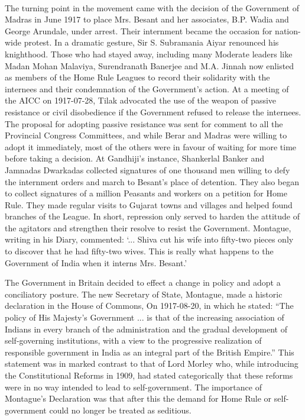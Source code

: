 \begin{multicols}{2}
\paragraph*{}
The turning point in the movement came with the decision of the Government of Madras in June 1917 to place Mrs. Besant and her associates, B.P. Wadia and George Arundale, under arrest. Their internment became the occasion for nation-wide protest. In a dramatic gesture, Sir S. Subramania Aiyar renounced his knighthood. Those who had stayed away, including many Moderate leaders like Madan Mohan Malaviya, Surendranath Banerjee and M.A. Jinnah now enlisted as members of the Home Rule Leagues to record their solidarity with the internees and their condemnation of the Government's action. At a meeting of the AICC on 1917-07-28, Tilak advocated the use of the weapon of passive resistance or civil disobedience if the Government refused to release the internees. The proposal for adopting passive resistance was sent for comment to all the Provincial Congress Committees, and while Berar and Madras were willing to adopt it immediately, most of the others were in favour of waiting for more time before taking a decision. At Gandhiji's instance, Shankerlal Banker and Jamnadas Dwarkadas collected signatures of one thousand men willing to defy the internment orders and march to Besant's place of detention. They also began to collect signatures of a million Peasants and workers on a petition for Home Rule. They made regular visits to Gujarat towns and villages and helped found branches of the League. In short, repression only served to harden the attitude of the agitators and strengthen their resolve to resist the Government. Montague, writing in his Diary, commented: `... Shiva cut his wife into fifty-two pieces only to discover that he had fifty-two wives. This is really what happens to the Government of India when it interns Mrs. Besant.'

The Government in Britain decided to effect a change in policy and adopt a conciliatory posture. The new Secretary of State, Montague, made a historic declaration in the House of Commons, On 1917-08-20, in which he stated: ``The policy of His Majesty's Government ... is that of the increasing association of Indians in every branch of the administration and the gradual development of self-governing institutions, with a view to the progressive realization of responsible government in India as an integral part of the British Empire.'' This statement was in marked contrast to that of Lord Morley who, while introducing the Constitutional Reforms in 1909, had stated categorically that these reforms were in no way intended to lead to self-government. The importance of Montague's Declaration was that after this the demand for Home Rule or self-government could no longer be treated as seditious.


\end{multicols}
